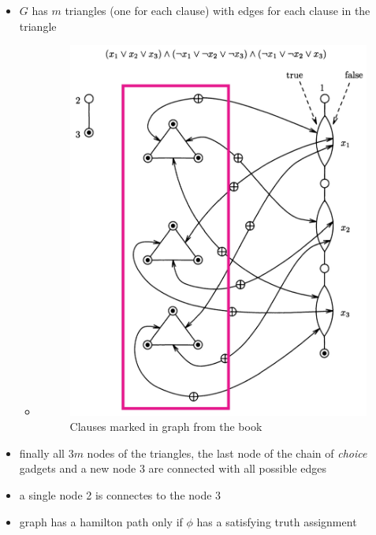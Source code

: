 \documentclass[a4]{scrartcl}
\begin{document}
\begin{itemize}
\item $G$ has $m$ triangles (one for each clause) with edges for each clause in the triangle
\begin{itemize}
\item[]
\begin{figure}[H]
\begin{center}
\includegraphics[scale=0.4]{triangle2.jpg}
\end{center}
\caption{Clauses marked in graph from the book \cite{book}}
\end{figure}
\end{itemize}

\item finally all $3m$ nodes of the triangles, the last node of the chain of \textit{choice} gadgets and a new node 3 are connected with all possible edges
\item a single node 2 is connectes to the node 3 \\

\item graph has a hamilton path only if $\phi$ has a satisfying truth assignment


\end{itemize}
\end{document}
